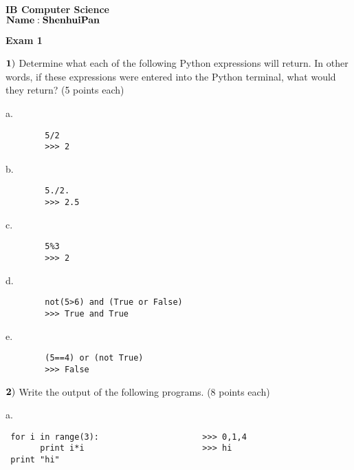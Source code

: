 \documentclass{article}
\begin{document}

\doublespacing
\textbf{IB Computer Science }                        %
 \hfill                             %
$ {\bf Name:Shenhui Pan}{\hspace{2.5in}}
$
\begin{centering}
\vspace{1cm}
\textbf{Exam 1}\\
\end{centering}
\vspace{1cm}
 
$\bf{1)}$ Determine what each of the following Python expressions will return.  In other words, if these expressions were entered into the Python terminal, what would they return?
(5 points each)

\vspace{1cm}
  
 a.  
 \begin{verbatim}
 		5/2
 		>>> 2
 \end{verbatim}

 
 b.   \begin{verbatim}
 		5./2.
 		>>> 2.5
 \end{verbatim}
  \vspace{1cm}
 
 c.  
  \begin{verbatim}
 		5%3
 		>>> 2
 \end{verbatim}
 \vspace{1cm}
  
 d. 
  \begin{verbatim}
 		not(5>6) and (True or False)
 		>>> True and True  
 \end{verbatim}
 \vspace{1cm}
 
 e. 
  \begin{verbatim}
 		(5==4) or (not True)
 		>>> False  
 \end{verbatim}
 \vspace{1cm}

  \newpage
  
 $\bf{2)}$ Write the output of the following programs. (8 points each)
 
 \vspace{1cm}

  
 a.   \begin{verbatim}
 for i in range(3):                     >>> 0,1,4
       print i*i                        >>> hi 
 print "hi"
                                    
 \end{verbatim}
 \vspace{1cm}
 
\end{document}
